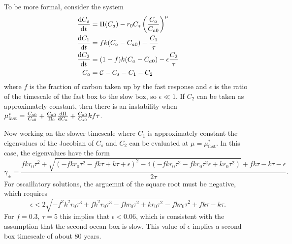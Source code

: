 To be more formal, consider the system
\begin{subequations}
  \begin{align}
    \label{eq:two_box_ocean}
    \dv{C_s}{t} &= \Pi(C_a) - r_0 C_s \left(\frac{C_a}{C_{a0}}\right)^{\mu} \\
    \dv{C_1}{t} &= fk(C_a - C_{a0}) - \frac{C_1}{\tau} \\
    \dv{C_2}{t} &= (1-f)k(C_a-C_{a0}) - \epsilon\frac{C_2}{\tau} \\
    C_a &= \mathcal{C} - C_s - C_1 - C_2
  \end{align}
\end{subequations}
where $f$ is the fraction of carbon taken up by the fast response and $\epsilon$ is the ratio of the timescale of the fast box to the slow box, so $\epsilon \ll 1$. If
$C_2$ can be taken as approximately constant, then there is an instability when $\mu^*_{\mathrm{fast}} = \frac{C_{a0}}{C_{s0}} + \frac{C_{a0}}{\Pi_0} \dv{\Pi}{C_a} + \frac{C_{a0}}{C_{s0}} kf\tau$.

Now working on the slower timescale where $C_1$ is approximately constant the eigenvalues of the Jacobian of $C_s$ and $C_2$ can be evaluated at $\mu = \mu^*_{\mathrm{fast}}$. In this case, the eigenvalues
have the form
\begin{equation}
  \label{eq:slow_eigenvalues}
  \gamma_{\pm} = \frac{f k r_0 \tau ^2+\sqrt{\left(-f k r_0 \tau ^2-f k \tau +k \tau +\epsilon \right)^2-4 \left(-f k r_0 \tau ^2-f k r_0 \tau ^2 \epsilon +k r_0 \tau ^2\right)}+f k \tau -k \tau -\epsilon }
  {2 \tau }.
\end{equation}
For oscaillatory solutions, the arguemnt of the square root must be negative, which requires
\begin{equation}
  \label{eq:epsilon_requirement}
  \epsilon < 2 \sqrt{-f^2 k^2 r_0 \tau ^3+f k^2 r_0 \tau ^3-f k r_0 \tau ^2+k r_0 \tau ^2}-f k r_0 \tau ^2+f k \tau -k \tau.
\end{equation}
For $f = 0.3$, $\tau = 5$ this implies that $\epsilon < 0.06$, which is consistent with the assumption that the second ocean box is slow. This value of $\epsilon$ implies a second box timescale
of about 80 years.
